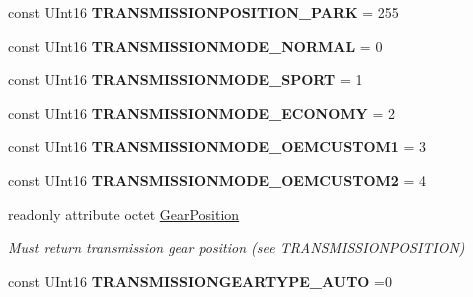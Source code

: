 \begin{DoxyCompactItemize}
\item 
\hypertarget{interfaceVehicle_1_1org_1_1automotive_1_1Transmission_a1c5ac8a82b3ebd1f5ed13761dceca075}{const U\-Int16 {\bfseries T\-R\-A\-N\-S\-M\-I\-S\-S\-I\-O\-N\-P\-O\-S\-I\-T\-I\-O\-N\-\_\-\-P\-A\-R\-K} = 255}\label{interfaceVehicle_1_1org_1_1automotive_1_1Transmission_a1c5ac8a82b3ebd1f5ed13761dceca075}

\item 
\hypertarget{interfaceVehicle_1_1org_1_1automotive_1_1Transmission_af4a3563b47464bbf48053d4f767c85c1}{const U\-Int16 {\bfseries T\-R\-A\-N\-S\-M\-I\-S\-S\-I\-O\-N\-M\-O\-D\-E\-\_\-\-N\-O\-R\-M\-A\-L} = 0}\label{interfaceVehicle_1_1org_1_1automotive_1_1Transmission_af4a3563b47464bbf48053d4f767c85c1}

\item 
\hypertarget{interfaceVehicle_1_1org_1_1automotive_1_1Transmission_a370afb3ad796e1825d815e82cec907d9}{const U\-Int16 {\bfseries T\-R\-A\-N\-S\-M\-I\-S\-S\-I\-O\-N\-M\-O\-D\-E\-\_\-\-S\-P\-O\-R\-T} = 1}\label{interfaceVehicle_1_1org_1_1automotive_1_1Transmission_a370afb3ad796e1825d815e82cec907d9}

\item 
\hypertarget{interfaceVehicle_1_1org_1_1automotive_1_1Transmission_aceb9a7cee690a0b4b4b0c9ffc9bd376f}{const U\-Int16 {\bfseries T\-R\-A\-N\-S\-M\-I\-S\-S\-I\-O\-N\-M\-O\-D\-E\-\_\-\-E\-C\-O\-N\-O\-M\-Y} = 2}\label{interfaceVehicle_1_1org_1_1automotive_1_1Transmission_aceb9a7cee690a0b4b4b0c9ffc9bd376f}

\item 
\hypertarget{interfaceVehicle_1_1org_1_1automotive_1_1Transmission_a079a59a3b306b9c345164a1baa2b4f2e}{const U\-Int16 {\bfseries T\-R\-A\-N\-S\-M\-I\-S\-S\-I\-O\-N\-M\-O\-D\-E\-\_\-\-O\-E\-M\-C\-U\-S\-T\-O\-M1} = 3}\label{interfaceVehicle_1_1org_1_1automotive_1_1Transmission_a079a59a3b306b9c345164a1baa2b4f2e}

\item 
\hypertarget{interfaceVehicle_1_1org_1_1automotive_1_1Transmission_ae45ac44511caf888e060766011bf0548}{const U\-Int16 {\bfseries T\-R\-A\-N\-S\-M\-I\-S\-S\-I\-O\-N\-M\-O\-D\-E\-\_\-\-O\-E\-M\-C\-U\-S\-T\-O\-M2} = 4}\label{interfaceVehicle_1_1org_1_1automotive_1_1Transmission_ae45ac44511caf888e060766011bf0548}

\item 
readonly attribute octet \hyperlink{interfaceVehicle_1_1org_1_1automotive_1_1Transmission_ac3ae5ab8450c0b1f234f15634577fc0f}{Gear\-Position}
\begin{DoxyCompactList}\small\item\em Must return transmission gear position (see T\-R\-A\-N\-S\-M\-I\-S\-S\-I\-O\-N\-P\-O\-S\-I\-T\-I\-O\-N) \end{DoxyCompactList}\item 
\hypertarget{interfaceVehicle_1_1org_1_1automotive_1_1Transmission_ad4e75ede8ce8e3063ba4c24d3fd241c6}{const U\-Int16 {\bfseries T\-R\-A\-N\-S\-M\-I\-S\-S\-I\-O\-N\-G\-E\-A\-R\-T\-Y\-P\-E\-\_\-\-A\-U\-T\-O} =0}\label{interfaceVehicle_1_1org_1_1automotive_1_1Transmission_ad4e75ede8ce8e3063ba4c24d3fd241c6}


\end{DoxyCompactItemize}
